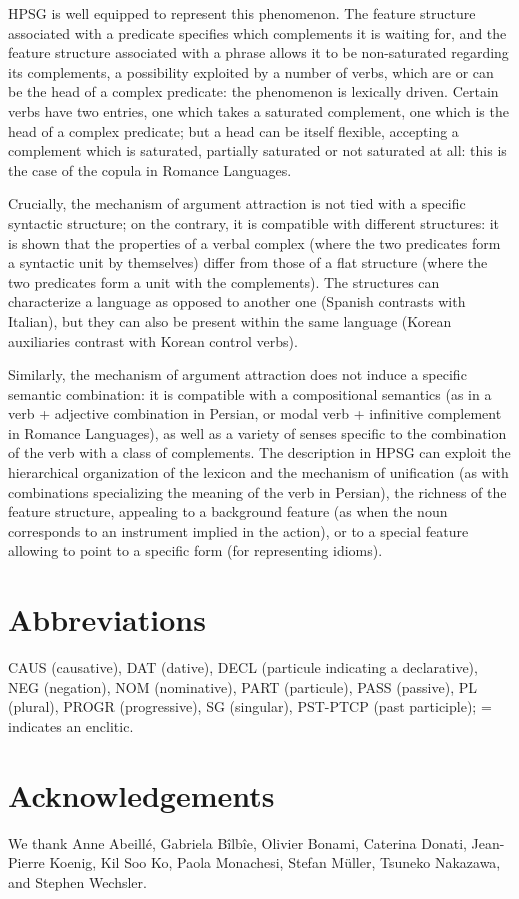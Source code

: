\documentclass[output=paper
                ,modfonts
                ,nonflat
	        ,collection
	        ,collectionchapter
	        ,collectiontoclongg
 	        ,biblatex
                ,babelshorthands
                ,newtxmath
                ,draftmode
                ,colorlinks, citecolor=brown
]{./langsci/langscibook}
\begin{document}
{HPSG is well equipped to represent this phenomenon. The feature structure associated with a predicate specifies which complements it is waiting for, and the feature structure associated with a phrase allows it to be non-saturated regarding its complements, a possibility exploited by a number of verbs, which are or can be the head of a complex predicate: the phenomenon is lexically driven. Certain verbs have two entries, one which takes a saturated complement, one which is the head of a complex predicate; but a head can be itself flexible, accepting a complement which is saturated, partially saturated or not saturated at all: this is the case of the copula in Romance Languages.

Crucially, the mechanism of argument attraction is not tied with a specific syntactic structure; on the contrary, it is compatible with different structures: it is shown that the properties of a verbal complex (where the two predicates form a syntactic unit by themselves) differ from those of a flat structure (where the two predicates form a unit with the complements). The structures can characterize a language as opposed to another one (Spanish contrasts with Italian), but they can also be present within the same language (Korean auxiliaries contrast with Korean control verbs).

Similarly, the mechanism of argument attraction does not induce a specific semantic combination: it is compatible with a compositional semantics (as in a verb + adjective combination in Persian, or modal verb + infinitive complement in Romance Languages), as well as a variety of senses specific to the combination of the verb with a class of complements. The description in HPSG can exploit the hierarchical organization of the lexicon and the mechanism of unification (as with combinations specializing the meaning of the verb in Persian), the richness of the feature structure, appealing to a background feature (as when the noun corresponds to an instrument implied in the action), or to a special feature allowing to point to a specific form (for representing idioms).    

} %

\section*{Abbreviations}

CAUS (causative), DAT (dative), DECL (particule indicating a declarative), 
NEG (negation), NOM (nominative), PART (particule), PASS (passive), PL (plural), PROGR
(progressive), SG (singular), PST-PTCP (past participle); = indicates an enclitic.

\section*{Acknowledgements}

We thank Anne Abeill\'e, Gabriela B\^ilb\^ie, Olivier Bonami, Caterina Donati,
  Jean-Pierre Koenig, Kil Soo Ko, Paola Monachesi, Stefan Müller, Tsuneko Nakazawa, and Stephen
  Wechsler. 

{\sloppy
	\printbibliography[heading=subbibliography,notkeyword=this]
}
\end{document}
